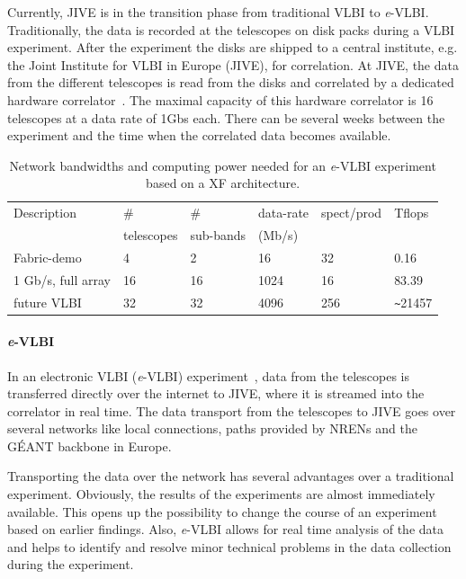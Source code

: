 Currently, JIVE is in the transition phase from traditional VLBI to
{\it e}-VLBI. Traditionally, the data is recorded at the telescopes on
disk packs during a VLBI experiment. After the experiment the disks
are shipped to a central institute, e.g. the Joint Institute for VLBI
in Europe (JIVE), for correlation. At JIVE, the data from the
different telescopes is read from the disks and correlated by a
dedicated hardware correlator~\cite{EVNCorrelator}. The maximal
capacity of this hardware correlator is 16 telescopes at a data rate
of 1Gbs each.  There can be several weeks between the experiment and
the time when the correlated data becomes available.

\begin{table}
  \centering
  \begin{tabular}[c]{|l|l|l|l|l|l|}
    \hline
    Description & \# & \#  & data-rate & spect/prod & Tflops\\
    & telescopes & sub-bands & (Mb/s) &  & \\
    \hline
    \hline
    Fabric-demo &4 &2 &16 &32 &0.16\\
    1 Gb/s, full array  &16 &16 &1024 &16 &83.39\\
    future VLBI &32 &32 &4096 &256 &\verb|~|21457\\
    \hline
  \end{tabular}
  \caption{Network bandwidths and computing power needed for an {\it e}-VLBI
    experiment based on a XF architecture.}
  \label{tab:speed}
\end{table}
\paragraph{{\it e}-VLBI}
In an electronic VLBI ({\it e}-VLBI) experiment~\cite{szomoru-2004},
data from the telescopes is transferred directly over the internet to
JIVE, where it is streamed into the correlator in real time. The data
transport from the telescopes to JIVE goes over several networks like
local connections, paths provided by NRENs and the G\'EANT backbone in
Europe.

Transporting the data over the network has several advantages over a
traditional experiment. Obviously, the results of the experiments are
almost immediately available. This opens up the possibility to change
the course of an experiment based on earlier findings. Also, {\it
  e}-VLBI allows for real time analysis of the data and helps to
identify and resolve minor technical problems in the data collection
during the experiment.

